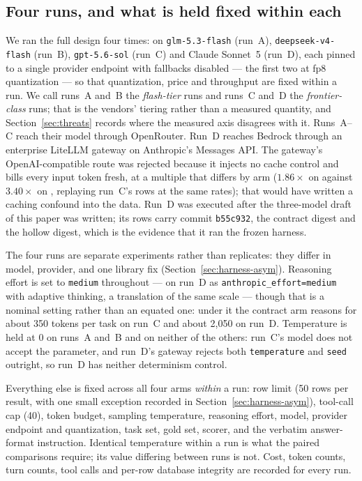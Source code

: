 \subsection{Four runs, and what is held fixed within each}
\label{sec:runs}

We ran the full design four times: on \texttt{glm-5.3-flash} (run~A),
\texttt{deepseek-v4-flash} (run~B), \texttt{gpt-5.6-sol} (run~C) and Claude
Sonnet~5 (run~D), each pinned to a single provider endpoint with fallbacks
disabled --- the first two at fp8 quantization --- so that quantization, price
and throughput are fixed within a run. We call runs~A and~B the
\emph{flash-tier} runs and runs~C and~D the \emph{frontier-class} runs; that
is the vendors' tiering rather than a measured quantity, and
Section~\ref{sec:threats} records where the measured axis disagrees with it.
Runs~A--C reach their model through OpenRouter. Run~D reaches Bedrock through
an enterprise LiteLLM gateway on Anthropic's Messages API. The gateway's
OpenAI-compatible route was rejected because it injects no cache control and
bills every input token fresh, at a multiple that differs by arm
($1.86{\times}$ on \armS{} against $3.40{\times}$ on \armM{}, replaying
run~C's rows at the same rates); that would have written a caching confound
into the data. Run~D was executed after the three-model draft of this paper
was written; its rows carry commit \texttt{b55c932}, the contract digest and
the hollow digest, which is the evidence that it ran the frozen harness.

The four runs are separate experiments rather than replicates: they differ in
model, provider, and one library fix (Section~\ref{sec:harness-asym}).
Reasoning effort is set to \texttt{medium} throughout --- on run~D as
\texttt{anthropic\_effort=medium} with adaptive thinking, a translation of the
same scale --- though that is a nominal setting rather than an equated one:
under it the contract arm reasons for about 350 tokens per task on run~C and
about 2{,}050 on run~D. Temperature is held at 0 on runs~A and~B and on
neither of the others: run~C's model does not accept the parameter, and
run~D's gateway rejects both \texttt{temperature} and \texttt{seed} outright,
so run~D has neither determinism control.

Everything else is fixed across all four arms \emph{within} a run: row limit
(50 rows per result, with one small exception recorded in
Section~\ref{sec:harness-asym}), tool-call cap (40), token budget, sampling
temperature, reasoning effort, model, provider endpoint and quantization, task
set, gold set, scorer, and the verbatim answer-format instruction. Identical
temperature within a run is what the paired comparisons require; its value
differing between runs is not. Cost, token counts, turn counts, tool calls and
per-row database integrity are recorded for every run.

